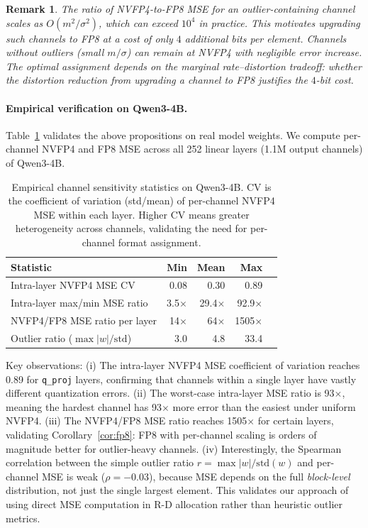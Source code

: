 \documentclass{article}
\newtheorem{remark}{Remark}
\begin{document}
\begin{remark}
The ratio of NVFP4-to-FP8 MSE for an outlier-containing channel scales as $O(m^2/\sigma^2)$, which can exceed $10^4$ in practice.
This motivates upgrading such channels to FP8 at a cost of only $4$ additional bits per element.
Channels without outliers (small $m/\sigma$) can remain at NVFP4 with negligible error increase.
The optimal assignment depends on the \emph{marginal rate--distortion tradeoff}: whether the distortion reduction from upgrading a channel to FP8 justifies the $4$-bit cost.
\end{remark}

\paragraph{Empirical verification on Qwen3-4B.}
Table~\ref{tab:sensitivity_data} validates the above propositions on real model weights.
We compute per-channel NVFP4 and FP8 MSE across all 252 linear layers (1.1M output channels) of Qwen3-4B.

\begin{table}[t]
\centering
\caption{Empirical channel sensitivity statistics on Qwen3-4B. CV is the coefficient of variation (std/mean) of per-channel NVFP4 MSE within each layer. Higher CV means greater heterogeneity across channels, validating the need for per-channel format assignment.}
\label{tab:sensitivity_data}
\small
\begin{tabular}{lrrrr}
\toprule
\textbf{Statistic} & \textbf{Min} & \textbf{Mean} & \textbf{Max} \\
\midrule
Intra-layer NVFP4 MSE CV & 0.08 & 0.30 & 0.89 \\
Intra-layer max/min MSE ratio & 3.5$\times$ & 29.4$\times$ & 92.9$\times$ \\
NVFP4/FP8 MSE ratio per layer & 14$\times$ & 64$\times$ & 1505$\times$ \\
Outlier ratio ($\max|w|/\mathrm{std}$) & 3.0 & 4.8 & 33.4 \\
\bottomrule
\end{tabular}
\end{table}

Key observations: (i) The intra-layer NVFP4 MSE coefficient of variation reaches 0.89 for \texttt{q\_proj} layers, confirming that channels within a single layer have vastly different quantization errors.
(ii) The worst-case intra-layer MSE ratio is 93$\times$, meaning the hardest channel has 93$\times$ more error than the easiest under uniform NVFP4.
(iii) The NVFP4/FP8 MSE ratio reaches 1505$\times$ for certain layers, validating Corollary~\ref{cor:fp8}: FP8 with per-channel scaling is orders of magnitude better for outlier-heavy channels.
(iv) Interestingly, the Spearman correlation between the simple outlier ratio $r = \max|w|/\mathrm{std}(w)$ and per-channel MSE is weak ($\rho = -0.03$), because MSE depends on the full \emph{block-level} distribution, not just the single largest element.
This validates our approach of using direct MSE computation in R-D allocation rather than heuristic outlier metrics.
\end{document}
